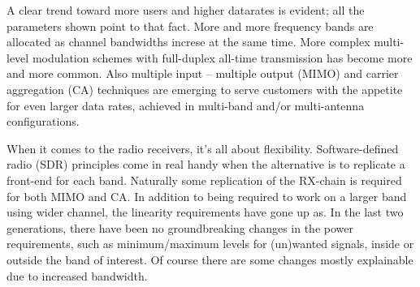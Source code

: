 \documentclass[a4paper, 12pt]{article}
\begin{document}
A clear trend toward more users and higher datarates is evident; all the 
parameters shown point to that fact. More and more frequency bands are 
allocated as channel bandwidths increse at the same time. More complex 
multi-level modulation schemes with full-duplex all-time transmission has 
become more and more common. Also multiple input -- multiple output (MIMO) 
and carrier aggregation (CA) techniques are emerging to serve customers 
with the appetite for even larger data rates, achieved in multi-band 
and/or multi-antenna configurations.

When it comes to the radio receivers, it's all about flexibility. 
Software-defined radio (SDR) principles come in real handy when the alternative 
is to replicate a front-end for each band. Naturally some replication of the 
RX-chain is required for both MIMO and CA. In addition to being required 
to work on a larger band using wider channel, the linearity requirements 
have gone up as. In the last two generations, there have been no groundbreaking 
changes in the power requirements, such as minimum/maximum levels for 
(un)wanted signals, inside or outside the band of interest. Of course 
there are some changes mostly explainable due to increased bandwidth.
\end{document}
